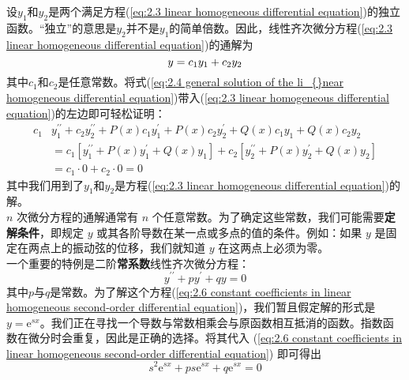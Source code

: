 	设$y_1$和$y_2$是两个满足方程(\ref{eq:2.3 linear homogeneous differential equation})的独立函数。“独立”的意思是$y_2$并不是$y_1$的简单倍数。因此，线性齐次微分方程(\ref{eq:2.3 linear homogeneous differential equation})的通解为
	\begin{equation}
		y = c_1y_1+c_2y_2
		\label{eq:2.4 general solution of the li_{}near homogeneous differential equation}
	\end{equation}
	其中$c_1$和$c_2$是任意常数。将式(\ref{eq:2.4 general solution of the li_{}near homogeneous differential equation})带入(\ref{eq:2.3 linear homogeneous differential equation})的左边即可轻松证明：
	\begin{equation}
		\begin{aligned}
			c_1 & y_1^{\prime\prime}+c_2y_2^{\prime\prime}+P\left(x\right)c_1y_1^{\prime}+P\left(x\right)c_2y_2^{\prime}+Q\left(x\right)c_1y_1+Q\left(x\right)c_2y_2\\
			& = c_1\left[	y_1^{\prime\prime}+P\left(x\right)y_1^{\prime}+Q\left(x\right)y_1\right]+c_2\left[	y_2^{\prime\prime}+P\left(x\right)y_2^{\prime}+Q\left(x\right)y_2\right]\\
			& = c_1 \cdot 0 + c_2 \cdot 0 = 0
		\end{aligned}
		\label{eq:2.5}
	\end{equation}
	其中我们用到了$y_1$和$y_2$是方程(\ref{eq:2.3 linear homogeneous differential equation})的解。\\
	\indent $n$ 次微分方程的通解通常有 $n$ 个任意常数。为了确定这些常数，我们可能需要\textbf{定解条件}，即规定 $y$ 或其各阶导数在某一点或多点的值的条件。例如：如果 $y$ 是固定在两点上的振动弦的位移，我们就知道 $y$ 在这两点上必须为零。\\
	\indent 一个重要的特例是二阶\textbf{常系数}线性齐次微分方程：
	\begin{equation}
		y^{\prime\prime}+py^{\prime}+qy=0
		\label{eq:2.6 constant coefficients in linear homogeneous second-order differential equation}
	\end{equation}
	其中$p$与$q$是常数。为了解这个方程(\ref{eq:2.6 constant coefficients in linear homogeneous second-order differential equation})，我们暂且假定解的形式是$y = \mathrm{e}^{sx}$。我们正在寻找一个导数与常数相乘会与原函数相互抵消的函数。指数函数在微分时会重复，因此是正确的选择。将其代入 (\ref{eq:2.6 constant coefficients in linear homogeneous second-order differential equation}) 即可得出
	\begin{equation*}
		s^2\mathrm{e}^{sx}+ps\mathrm{e}^{sx}+q\mathrm{e}^{sx}=0
	\end{equation*}
